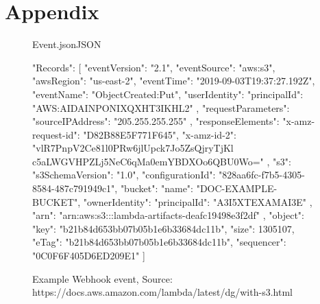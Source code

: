 \chapter{Appendix}
\begin{figure}
\begin{codeblock}{Event.json}{JSON}
\begin{javacode}
	{
		"Records": [
		{
			"eventVersion": "2.1",
			"eventSource": "aws:s3",
			"awsRegion": "us-east-2",
			"eventTime": "2019-09-03T19:37:27.192Z",
			"eventName": "ObjectCreated:Put",
			"userIdentity": {
				"principalId": "AWS:AIDAINPONIXQXHT3IKHL2"
			},
			"requestParameters": {
				"sourceIPAddress": "205.255.255.255"
			},
			"responseElements": {
				"x-amz-request-id": "D82B88E5F771F645",
				"x-amz-id-2": "vlR7PnpV2Ce81l0PRw6jlUpck7Jo5ZsQjryTjKl
					c5aLWGVHPZLj5NeC6qMa0emYBDXOo6QBU0Wo="
			},
			"s3": {
				"s3SchemaVersion": "1.0",
				"configurationId": "828aa6fc-f7b5-4305-8584-487c791949c1",
				"bucket": {
					"name": "DOC-EXAMPLE-BUCKET",
					"ownerIdentity": {
						"principalId": "A3I5XTEXAMAI3E"
					},
					"arn": "arn:aws:s3:::lambda-artifacts-deafc19498e3f2df"
				},
				"object": {
					"key": "b21b84d653bb07b05b1e6b33684dc11b",
					"size": 1305107,
					"eTag": "b21b84d653bb07b05b1e6b33684dc11b",
					"sequencer": "0C0F6F405D6ED209E1"
				}
			}
		}
		]
	}
	\end{javacode}
\end{codeblock}
\caption{Example Webhook event, Source: https://docs.aws.amazon.com/lambda/latest/dg/with-s3.html}
\end{figure}